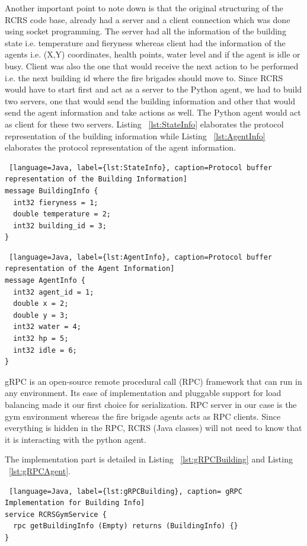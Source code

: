 \documentclass[12pt]{report}
\begin{document}
Another important point to note down is that the original structuring of the RCRS code base, already had a server and a client connection which was done using socket programming. The server had all the information of the building state i.e. temperature and fieryness whereas client had the information of the agents i.e. (X,Y) coordinates, health points, water level and if the agent is idle or busy. Client was also the one that would receive the next action to be performed i.e. the next building id where the fire brigades should move to. Since RCRS would have to start first and act as a server to the Python agent, we had to build two servers, one that would send the building information and other that would send the agent information and take actions as well. The Python agent would act as client for these two servers. Listing ~\ref{lst:StateInfo} elaborates the protocol representation of the building information while Listing ~\ref{lst:AgentInfo} elaborates the protocol representation of the agent information. 

\begin{lstlisting} [language=Java, label={lst:StateInfo}, caption=Protocol buffer representation of the Building Information] 
message BuildingInfo {
  int32 fieryness = 1;
  double temperature = 2;
  int32 building_id = 3;
}
\end{lstlisting}

\begin{lstlisting} [language=Java, label={lst:AgentInfo}, caption=Protocol buffer representation of the Agent Information] 
message AgentInfo {
  int32 agent_id = 1;
  double x = 2;
  double y = 3; 
  int32 water = 4;
  int32 hp = 5; 
  int32 idle = 6;
}
\end{lstlisting}

gRPC is an open-source remote procedural call (RPC) framework that can run in any environment. Its ease of implementation and pluggable support for load balancing made it our first choice for serialization. 
RPC server in our case is the gym environment whereas the fire brigade agents acts as RPC clients. Since everything is hidden in the RPC, RCRS (Java classes) will not need to know that it is interacting with the python agent. 

The implementation part is detailed in Listing ~\ref{lst:gRPCBuilding} and Listing ~\ref{lst:gRPCAgent}. 

\begin{lstlisting} [language=Java, label={lst:gRPCBuilding}, caption= gRPC Implementation for Building Info] 
service RCRSGymService {
  rpc getBuildingInfo (Empty) returns (BuildingInfo) {}
}
\end{lstlisting}
\end{document}
